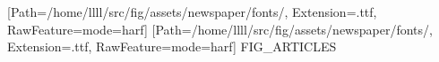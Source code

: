 \documentclass{article}
\date{\today}
\begin{document}
\maketitle

\begin{multicols}{3}
\setmainfont{NoticiaText-Regular}[Path=/home/llll/src/fig/assets/newspaper/fonts/, Extension=.ttf, RawFeature={mode=harf}]
\newfontfamily{}[Path=/home/llll/src/fig/assets/newspaper/fonts/, Extension=.ttf, RawFeature={mode=harf}]
FIG_ARTICLES
\end{multicols}
\end{document}
